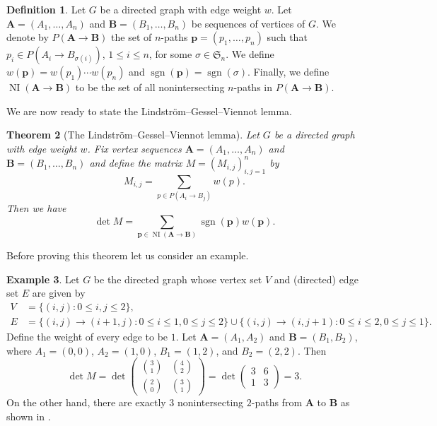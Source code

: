 \documentclass[oneside]{book}
\numberwithin{equation}{section}
\newtheorem{thm}{Theorem}[section]
\theoremstyle{definition}
\newtheorem{exam}[thm]{Example}
\newtheorem{defn}[thm]{Definition}
\newcommand\NI{\operatorname{NI}}
\newcommand\sgn{\operatorname{sgn}}
\newcommand\sym{\mathfrak{S}}
\renewcommand\vec[1]{\mathbf{#1}}
\begin{document}
\begin{defn}\label{def:4}
  Let \( G \) be a directed graph with edge weight \( w \). Let
  \( \vec{A} = (A_1,\dots,A_n) \) and \( \vec B = (B_1,\dots,B_n) \)
  be sequences of vertices of \( G \). We denote by
  \( P(\vec A\to \vec B) \) the set of \( n \)-paths
  \( \vec p = (p_1,\dots,p_n) \) such that
  \( p_i\in P(A_i\to B_{\sigma(i)}) \), \( 1\le i\le n \), for some
  \( \sigma\in \sym_n \). We define
  \( w(\vec p) = w(p_1) \cdots w(p_n) \) and
  \( \sgn(\vec p)= \sgn(\sigma) \). Finally, we define
  \( \NI(\vec A\to \vec B) \) to be the set of all nonintersecting
  \( n \)-paths in \( P(\vec A\to \vec B) \).
\end{defn}

We are now ready to state the Lindstr\"om--Gessel--Viennot lemma.

\begin{thm}[The Lindstr\"om--Gessel--Viennot lemma]\label{thm:LGV}
  Let \( G \) be a directed graph with edge weight \( w \). Fix vertex
  sequences \( \vec A = (A_1,\dots,A_n) \) and
  \( \vec B = (B_1,\dots,B_n) \) and define the matrix
  \( M = (M_{i,j})_{i,j=1}^n \) by
\[
  M_{i,j} = \sum_{p\in P(A_i\to B_j)} w(p).
\]
Then we have
\[
  \det M = \sum_{\vec p \in \NI(\vec A \to \vec B)} \sgn(\vec p) w(\vec p).
\]
\end{thm}

Before proving this theorem let us consider an example.

\begin{exam}
  Let \( G \) be the directed graph whose vertex set \( V \)
  and (directed) edge set \( E \) are given by
  \begin{align*}
    V &= \{(i,j): 0\le i,j\le 2\},\\
    E &= \{(i,j)\to (i+1,j): 0\le i\le 1, 0\le j\le 2\}
        \cup \{(i,j)\to (i,j+1): 0\le i\le 2, 0\le j\le 1\}.
  \end{align*}
  Define the weight of every edge to be \( 1 \). Let
  \( \vec A = (A_1,A_2) \) and \( \vec B = (B_1,B_2) \), where
  \( A_1 = (0,0) \), \( A_2 = (1,0) \), \( B_1 = (1,2) \), and
  \( B_2 = (2,2) \). Then
  \[
  \det  M =
    \det \begin{pmatrix}
\binom{3}{1} & \binom{4}{2}\\[4pt]
\binom{2}{0} & \binom{3}{1}
\end{pmatrix}
= \det \begin{pmatrix}
3 & 6\\
1 & 3
\end{pmatrix} = 3.
  \]
  On the other hand, there are exactly \( 3 \) nonintersecting
  \( 2 \)-paths from \( \vec A \) to \( \vec B \) as shown in
  .
\end{exam}
\end{document}
